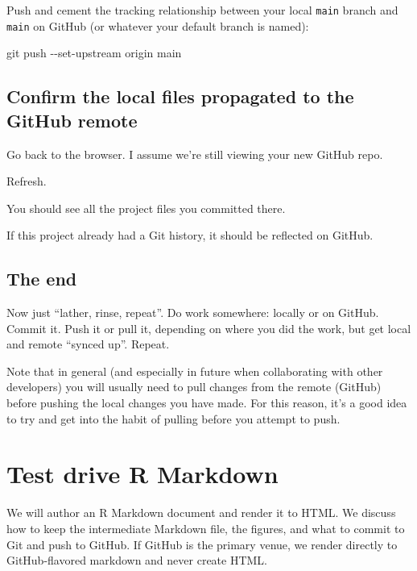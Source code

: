 \documentclass[
]{book}
\newenvironment{Shaded}{\begin{snugshade}}{\end{snugshade}}
\newcommand{\NormalTok}[1]{#1}
\begin{document}
Push and cement the tracking relationship between your local \texttt{main} branch and \texttt{main} on GitHub (or whatever your default branch is named):

\begin{Shaded}
\begin{Highlighting}[]
\NormalTok{git push {-}{-}set{-}upstream origin main}
\end{Highlighting}
\end{Shaded}

\section{Confirm the local files propagated to the GitHub remote}\label{confirm-the-local-files-propagated-to-the-github-remote}

Go back to the browser.
I assume we're still viewing your new GitHub repo.

Refresh.

You should see all the project files you committed there.

If this project already had a Git history, it should be reflected on GitHub.

\section{The end}\label{the-end-2}

Now just ``lather, rinse, repeat''.
Do work somewhere: locally or on GitHub.
Commit it.
Push it or pull it, depending on where you did the work, but get local and remote ``synced up''.
Repeat.

Note that in general (and especially in future when collaborating with other developers) you will usually need to pull changes from the remote (GitHub) before pushing the local changes you have made.
For this reason, it's a good idea to try and get into the habit of pulling before you attempt to push.

\chapter{Test drive R Markdown}\label{rmd-test-drive}

We will author an R Markdown document and render it to HTML.
We discuss how to keep the intermediate Markdown file, the figures, and what to commit to Git and push to GitHub.
If GitHub is the primary venue, we render directly to GitHub-flavored markdown and never create HTML.
\end{document}
